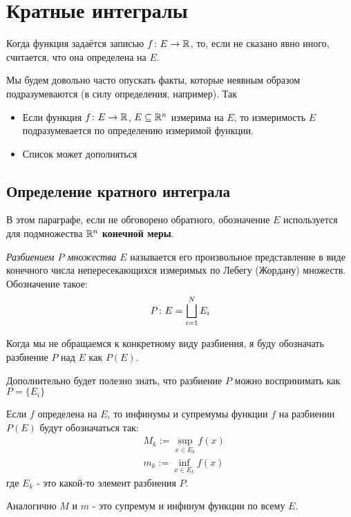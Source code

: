\section{Кратные интегралы}

\begin{designation}
	Когда функция задаётся записью $f \colon E \to \mathbb{R}$, то, если не сказано явно иного, считается, что она определена на $E$.
\end{designation}

\begin{note}
	Мы будем довольно часто опускать факты, которые неявным образом подразумеваются (в силу определения, например). Так
	\begin{itemize}
		\item Если функция $f \colon E \to \mathbb{R}$, $E \subseteq \mathbb{R}^n$ измерима на $E$, то измеримость $E$ подразумевается по определению измеримой функции.
		
		\item Список может дополняться
	\end{itemize}
\end{note}

\subsection{Определение кратного интеграла}

\begin{designation}
	В этом параграфе, если не обговорено обратного, обозначение $E$ используется для подмножества $\mathbb{R}^n$ \textbf{конечной меры}.
\end{designation}

\begin{definition}
	\textit{Разбиением $P$ множества $E$} называется его произвольное представление в виде конечного числа непересекающихся измеримых по Лебегу (Жордану) множеств. Обозначение такое:
	\[
		P \colon E = \bigsqcup_{i = 1}^N E_i
	\]
\end{definition}

\begin{anote}
	Когда мы не обращаемся к конкретному виду разбиения, я буду обозначать разбиение $P$ над $E$ как $P(E)$.
	
	Дополнительно будет полезно знать, что разбиение $P$ можно воспринимать как $P = \{E_i\}$
\end{anote}

\begin{designation}
	Если $f$ определена на $E$, то инфинумы и супремумы функции $f$ на разбиении $P(E)$ будут обозначаться так:
	\begin{align*}
		&{M_k := \sup_{x \in E_k} f(x)}
		\\
		&{m_k := \inf_{x \in E_k} f(x)}
	\end{align*}
	где $E_k$ - это какой-то элемент разбиения $P$.
	
	Аналогично $M$ и $m$ - это супремум и инфинум функции по всему $E$.
\end{designation}

